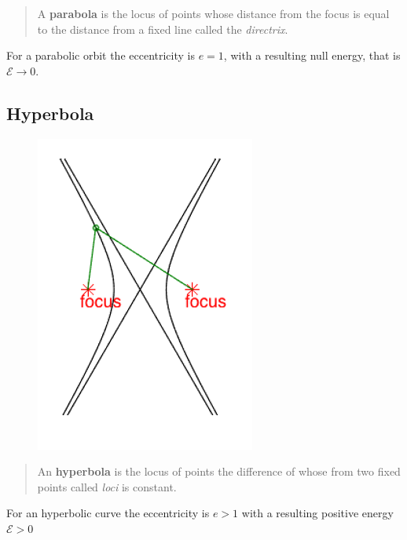 \begin{quotation}
    \color{red}
    A \textbf{parabola} is the locus of points whose distance from the focus is equal to the distance from a fixed line called the \textit{directrix}.
\end{quotation}
For a parabolic orbit the eccentricity is $e=1$, with a resulting null energy, that is $\mathcal{E} \to 0$.

\subsection{Hyperbola}
\begin{figure}[h]
    \centering
    \includegraphics[scale=0.6]{AerospaceApplications/images/hyperbola.png}
\end{figure}
\begin{quotation}
    \color{red}
    An \textbf{hyperbola} is the locus of points the difference of whose from two fixed points called \textit{loci} is constant.
\end{quotation}
For an hyperbolic curve the eccentricity is $e>1$ with a resulting positive energy $\mathcal{E}>0$

